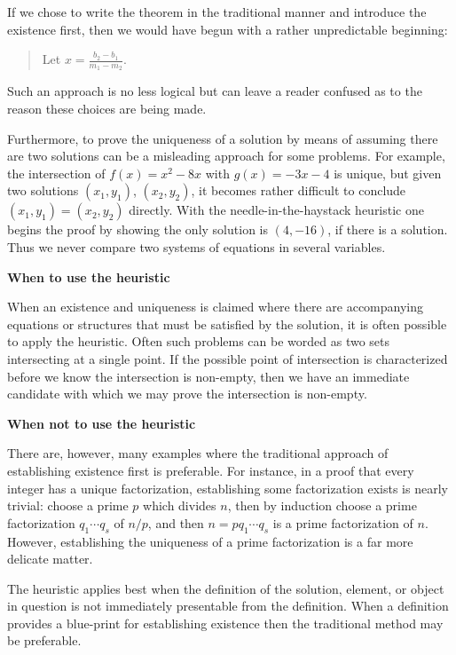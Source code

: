 \documentclass[12pt]{article}
\begin{document}
If we chose to write the theorem in the traditional manner and introduce the existence first, then we would have begun with a rather unpredictable beginning:
\begin{quote}
Let $\displaystyle x=\frac{b_2-b_1}{m_1-m_2}$.
\end{quote}
Such an approach is no less logical but can leave a reader confused as to the reason these choices are being made. 

Furthermore, to prove the uniqueness of a solution by means of assuming there are two solutions can be a misleading approach for some problems.  For example, the intersection of $f(x)=x^2-8x$ with $g(x)=-3x-4$ is unique, but given two solutions $(x_1,y_1)$, $(x_2,y_2)$, it becomes rather difficult to conclude $(x_1,y_1)=(x_2,y_2)$ directly.  With the needle-in-the-haystack heuristic one begins the proof by showing the only solution is $(4,-16)$, if there is a solution.  Thus we never compare two systems of equations in several variables.

\textbf{When to use the heuristic}

When an existence and uniqueness is claimed where there are accompanying equations or structures that must be satisfied by the solution, it is often possible to apply the heuristic.  Often such problems can be worded as two sets intersecting at a single point.  If the possible point of intersection is characterized before we know the intersection is non-empty, then we have an immediate candidate with which we may prove the intersection is non-empty.

\textbf{When not to use the heuristic}

There are, however, many examples where the traditional approach of establishing existence first is preferable.  For instance, in a proof that every integer has a unique factorization, establishing some factorization exists is nearly trivial: choose a prime $p$ which divides $n$, then by induction choose a prime factorization $q_1\cdots q_s$ of $n/p$, and then $n=p q_1\cdots q_s$ is a prime factorization of $n$.  However, establishing the uniqueness of a prime factorization is a far more delicate matter.

The heuristic applies best when the definition of the solution, element, or object in question is not immediately presentable from the definition.  When a definition provides a blue-print for establishing existence then the traditional method may be preferable.

\end{document}
